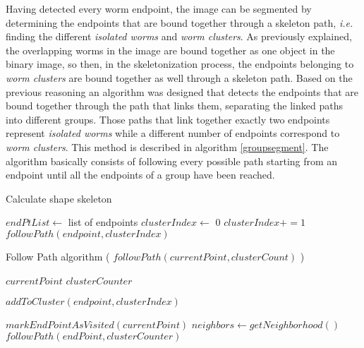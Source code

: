 Having detected every worm endpoint, the image can be segmented by determining
the endpoints that are bound together through a skeleton path, \emph{i.e.} finding 
the different \emph{isolated worms} and \emph{worm clusters}.
As previously explained, the overlapping worms in the image are bound together
as one object in the binary image, so then, in the skeletonization
process, the endpoints belonging to \emph{worm clusters} are bound together as well through a skeleton path.
Based on the previous reasoning an algorithm was designed that detects the endpoints 
that are bound together through the path that links them, separating the 
linked paths into different groups. Those paths that link together exactly two
endpoints represent \emph{isolated worms} while a different number of endpoints
correspond to \emph{worm clusters}.
This method is described in algorithm \ref{groupsegment}. The algorithm basically consists of following every
possible path starting from an endpoint until all the endpoints of a 
group have been reached. 

\begin{algorithm}                     
\caption{Calculate shape skeleton}         
\label{groupsegment}                    
\begin{algorithmic}                   

\STATE $endPtList \leftarrow$ list of endpoints
\STATE $clusterIndex \leftarrow$ 0
\STATE {}
\ELSE
\STATE $clusterIndex +=1$
\STATE $followPath(endpoint,clusterIndex)$
\ENDIF
\ENDFOR
\end{algorithmic}
\end{algorithm}

\begin{algorithm}                     
\caption{Follow Path algorithm ( $followPath(currentPoint,clusterCount)$ )}         
\begin{algorithmic}                   

\REQUIRE $currentPoint$
\REQUIRE $clusterCounter$

\RETURN 
\ELSE
\STATE $addToCluster(endpoint,clusterIndex)$
\ENDIF

\STATE {}
\STATE $markEndPointAsVisited(currentPoint)$
\ENDIF
\STATE $neighbors \leftarrow getNeighborhood()$
\STATE $followPath(endPoint,clusterCounter)$
\ENDFOR

\end{algorithmic}
\end{algorithm}


